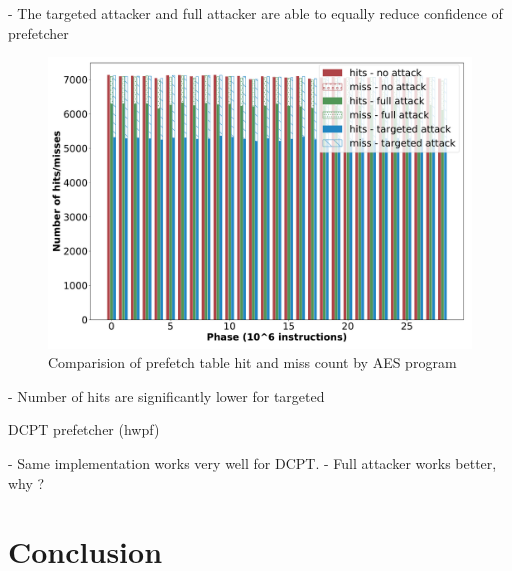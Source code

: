 \documentclass[conference]{IEEEtran}
\begin{document}
 - The targeted attacker and full attacker are able to equally reduce confidence
   of prefetcher

\begin{figure}[htbp]
    \centering
    \includegraphics[width=\columnwidth]{pf_hits}
    \caption{Comparision of prefetch table hit and miss count by AES program}
    \label{fig:targeted_hitrate}
\end{figure}


 - Number of hits are significantly lower for targeted

DCPT prefetcher (hwpf)

 - Same implementation works very well for DCPT.
 - Full attacker works better, why ?

\section{Conclusion}





\end{document}
